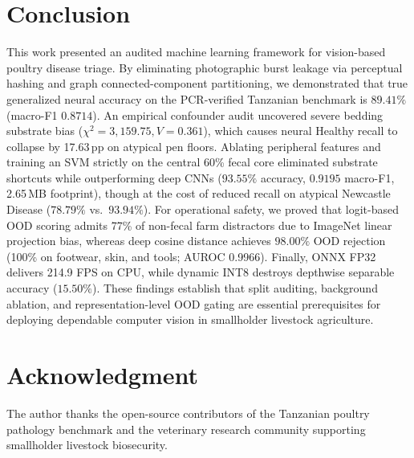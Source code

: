 \documentclass[conference]{IEEEtran}
\begin{document}
\section{Conclusion}
This work presented an audited machine learning framework for vision-based poultry disease triage. By eliminating photographic burst leakage via perceptual hashing and graph connected-component partitioning, we demonstrated that true generalized neural accuracy on the PCR-verified Tanzanian benchmark is $89.41\%$ (macro-F1 $0.8714$). An empirical confounder audit uncovered severe bedding substrate bias ($\chi^2 = 3{,}159.75, V = 0.361$), which causes neural Healthy recall to collapse by 17.63\,pp on atypical pen floors. Ablating peripheral features and training an SVM strictly on the central 60\% fecal core eliminated substrate shortcuts while outperforming deep CNNs ($93.55\%$ accuracy, $0.9195$ macro-F1, 2.65\,MB footprint), though at the cost of reduced recall on atypical Newcastle Disease ($78.79\%$ vs.\ $93.94\%$). For operational safety, we proved that logit-based OOD scoring admits 77\% of non-fecal farm distractors due to ImageNet linear projection bias, whereas deep cosine distance achieves $98.00\%$ OOD rejection (100\% on footwear, skin, and tools; AUROC 0.9966). Finally, ONNX FP32 delivers 214.9 FPS on CPU, while dynamic INT8 destroys depthwise separable accuracy ($15.50\%$). These findings establish that split auditing, background ablation, and representation-level OOD gating are essential prerequisites for deploying dependable computer vision in smallholder livestock agriculture.

\section*{Acknowledgment}
The author thanks the open-source contributors of the Tanzanian poultry pathology benchmark \cite{machuve2022poultry} and the veterinary research community supporting smallholder livestock biosecurity.
\end{document}
